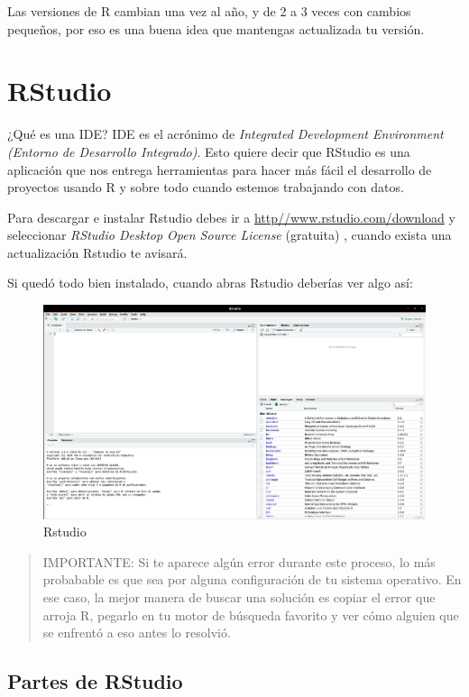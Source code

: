 \documentclass[12pt,]{book}
\begin{document}
Las versiones de R cambian una vez al año, y de 2 a 3 veces con cambios
pequeños, por eso es una buena idea que mantengas actualizada tu
versión.

\section{RStudio}\label{rstudio}

¿Qué es una IDE? IDE es el acrónimo de \emph{Integrated Development
Environment (Entorno de Desarrollo Integrado)}. Esto quiere decir que
RStudio es una aplicación que nos entrega herramientas para hacer más
fácil el desarrollo de proyectos usando R y sobre todo cuando estemos
trabajando con datos.

Para descargar e instalar Rstudio debes ir a
\url{http//www.rstudio.com/download} y seleccionar \emph{RStudio Desktop
Open Source License} (gratuita) , cuando exista una actualización
Rstudio te avisará.

Si quedó todo bien instalado, cuando abras Rstudio deberías ver algo
así:

\begin{figure}

{\centering \includegraphics[width=0.5\linewidth]{images/rstudio} 

}

\caption{Rstudio}\label{fig:fig3}
\end{figure}

\begin{quote}
IMPORTANTE: Si te aparece algún error durante este proceso, lo más
probabable es que sea por alguna configuración de tu sistema operativo.
En ese caso, la mejor manera de buscar una solución es copiar el error
que arroja R, pegarlo en tu motor de búsqueda favorito y ver cómo
alguien que se enfrentó a eso antes lo resolvió.
\end{quote}

\subsection{Partes de RStudio}\label{partes-de-rstudio}
\end{document}
